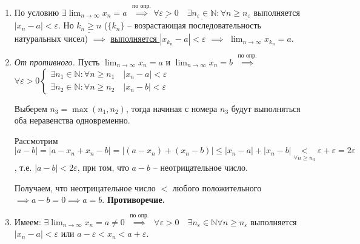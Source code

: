 \documentclass{article}
\begin{document}
\begin{enumerate}
    \item По условию $\exists \displaystyle\lim_{n \to \infty} x_n = a$
    $\stackrel{\text{по опр.}}{\implies} \underline{\forall \varepsilon > 0}
    \quad \underline{\exists n_\varepsilon \in \mathbb{N}}: 
    \forall n \ge \underline{n_\varepsilon}$ выполняется 
    $\left| x_n - a \right| < \varepsilon$. Но $\underline{k_n \ge n}$
    ($\{k_n\}$ -- возрастающая последовательность натуральных чисел)
    $\implies$ \underline{выполняется $\left| x_{k_n} - a \right| < \varepsilon$}
    $\implies$ $\displaystyle\lim_{n \to \infty} x_{k_n} = a$.

    \item \textit{От противного.} Пусть $\displaystyle\lim_{n \to \infty} x_n = a$ и
    $\displaystyle\lim_{n \to \infty} x_n = b$ $\stackrel{\text{по опр.}}{\implies}$
    $\forall \varepsilon > 0 \begin{cases}
        \exists n_1 \in \mathbb{N}: \forall n \ge n_1 \quad \left| x_n - a \right| < \varepsilon \\
        \exists n_2 \in \mathbb{N}: \forall n \ge n_2 \quad \left| x_n - b \right| < \varepsilon
    \end{cases}$

    Выберем $n_3 = \max \left( n_1, n_2 \right)$, тогда начиная с номера $n_3$ будут выполняться оба
    неравенства одновременно.

    Рассмотрим $\left| a - b \right| = \left| a - x_n + x_n - b \right| = 
    \left| (a - x_n) + (x_n - b) \right| \le \left| x_n - a \right| + 
    \left| x_n - b \right| \underset{\forall n \ge n_3}{<}
    \varepsilon + \varepsilon = 2 \varepsilon$, т.е. $\left| a - b \right| < 2 \varepsilon$,
    при том, что $a - b$ -- неотрицательное число.

    Получаем, что неотрицательное число $<$ любого положительного 
    $\implies a - b = 0 \implies a = b$. \textbf{Противоречие.}

    \item Имеем: $\exists \displaystyle\lim_{n \to \infty} x_n = a \ne 0$
    $\stackrel{\text{по опр.}}{\implies}$ 
    $\forall \varepsilon > 0 \quad \exists n_\varepsilon \in \mathbb{N} 
    \forall n \ge n_\varepsilon$ выполняется $\left| x_n - a \right| < \varepsilon$
    или $a - \varepsilon < x_n < a + \varepsilon$.
    

\end{enumerate}
\end{document}
